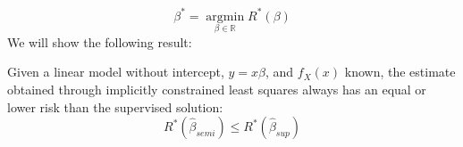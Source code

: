 \documentclass{llncs}
\begin{document}
\begin{equation} \label{eq:bayesoptimal}
\beta^* = \operatorname*{argmin}_{\beta \in \mathbb{R}} R^*(\beta)
\end{equation}
We will show the following result:
\begin{theorem}
\label{theorem:1d}
Given a linear model without intercept, $y = x\beta$, and $f_X(x)$ known, the estimate obtained through implicitly constrained least squares always has an equal or lower risk than the supervised solution: $$R^\ast (\hat{\beta}_{semi}) \le R^\ast (\hat{\beta}_{sup})$$
\end{theorem}
\end{document}
